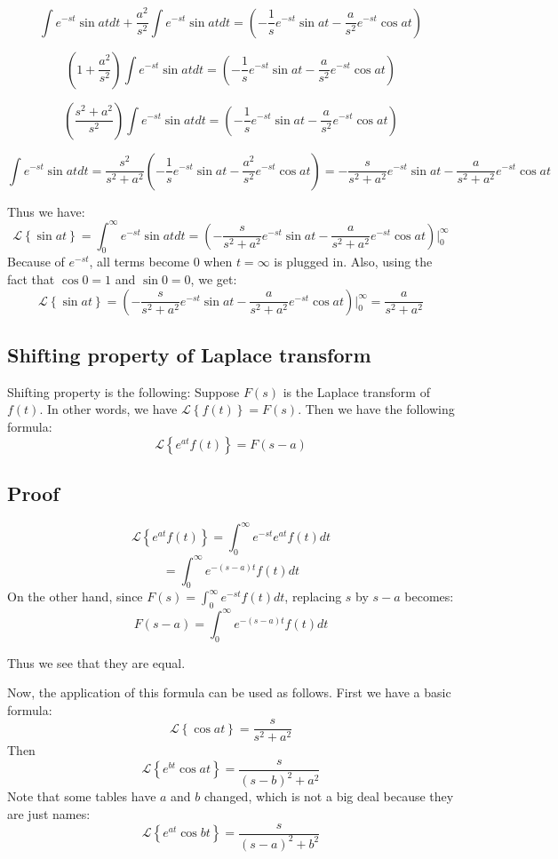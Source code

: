 \documentclass[12pt]{report}
\begin{document}
$$\int  e^{-st} \sin at dt +\frac{a^2}{s^2} \int  e^{-st} \sin at dt = \left( - \frac{1}{s} e^{-st} \sin at - \frac{a}{s^2} e^{-st} \cos at \right)  $$

$$ \left(1+ \frac{a^2}{s^2} \right)\int  e^{-st} \sin at dt  = \left( - \frac{1}{s} e^{-st} \sin at - \frac{a}{s^2} e^{-st} \cos at \right)  $$

$$ \left( \frac{s^2+a^2}{s^2} \right)\int  e^{-st} \sin at dt  = \left( - \frac{1}{s} e^{-st} \sin at - \frac{a}{s^2} e^{-st} \cos at \right)  $$

$$ \int  e^{-st} \sin at dt  = \frac{s^2}{s^2+a^2} \left( - \frac{1}{s} e^{-st} \sin at - \frac{a^2}{s^2} e^{-st} \cos at \right)  = - \frac{s}{s^2+a^2} e^{-st} \sin at - \frac{a}{s^2+a^2} e^{-st} \cos at $$

Thus we have:
$$ \mathscr{L} \left\{ \sin at \right\}= \int_0^{\infty}  e^{-st} \sin at dt = \left( - \frac{s}{s^2+a^2} e^{-st} \sin at - \frac{a}{s^2+a^2} e^{-st} \cos at \right) \Bigg\vert_0^{\infty} $$
Because of $e^{-st}$, all terms become 0 when $t=\infty$ is plugged in. Also, using the fact that $\cos 0 =1$ and $\sin 0 =0$, we get:
$$ \mathscr{L} \left\{ \sin at \right\}= \left( - \frac{s}{s^2+a^2} e^{-st} \sin at - \frac{a}{s^2+a^2} e^{-st} \cos at \right) \Bigg\vert_0^{\infty} = \frac{a}{s^2+a^2}$$

\subsection*{Shifting property of Laplace transform }

Shifting property is the following:
Suppose $F(s)$ is the Laplace transform of $f(t)$. In other words, we have $ \mathscr{L} \left\{f(t) \right\} = F(s)$. Then we have the following formula:
$$ \mathscr{L} \left\{e^{at} f(t) \right\} = F(s-a)$$
\subsection*{Proof}
$$ \mathscr{L} \left\{e^{at} f(t) \right\} = \int_0^{\infty}  e^{-st} e^{at} f(t) dt $$
$$= \int_0^{\infty}  e^{-(s-a)t} f(t) dt$$
On the other hand, since $F(s) = \int_0^{\infty}  e^{-st} f(t) dt $, replacing $s$ by $s-a$ becomes:
$$F(s-a) = \int_0^{\infty}  e^{-(s-a)t} f(t) dt $$

Thus we see that they are equal.

Now, the application of this formula can be used as follows. First we have a basic formula:
$$ \mathscr{L} \left\{ \cos at \right\} = \frac{s}{s^2 + a^2} $$
Then
$$ \mathscr{L} \left\{ e^{bt} \cos at \right\} = \frac{s}{(s-b)^2 + a^2} $$
Note that some tables have $a$ and $b$ changed, which is not a big deal because they are just names:
$$ \mathscr{L} \left\{ e^{at} \cos bt \right\} = \frac{s}{(s-a)^2 + b^2} $$
\end{document}
